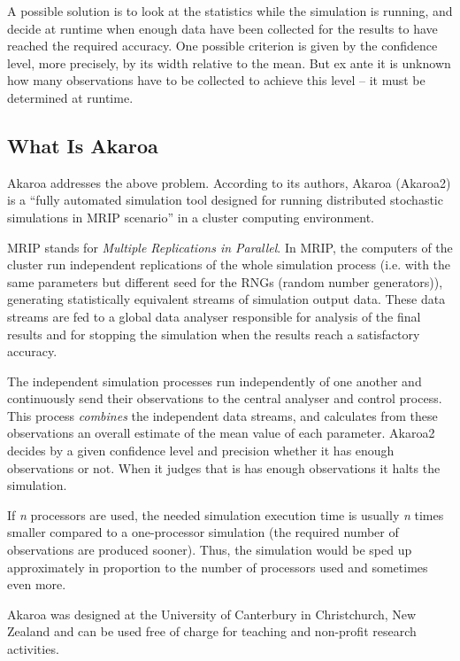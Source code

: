 A possible solution is to look at the statistics while the simulation
is running, and decide at runtime when enough data have been
collected for the results to have reached the required accuracy.
One possible criterion is given by the confidence level,
more precisely, by its width relative to the mean.
But ex ante it is unknown how many observations have to be collected
to achieve this level -- it must be determined at runtime.


\subsection{What Is Akaroa}
\label{sec:run-sim:what-is-akaroa}

Akaroa \cite{Akaroa99} addresses the above problem.
According to its authors, Akaroa (Akaroa2) is a ``fully automated
simulation tool designed for running distributed stochastic simulations
in MRIP scenario'' in a cluster computing environment.

MRIP stands for \textit{Multiple Replications in Parallel}.
In MRIP, the computers of the cluster run independent replications
of the whole simulation process (i.e. with the same parameters but
different seed for the RNGs (random number generators)),
generating statistically equivalent streams of simulation output data.
These data streams are fed to a global data analyser responsible for
analysis of the final results and for stopping the simulation
when the results reach a satisfactory accuracy.

The independent simulation processes run independently of one another
and continuously send their observations to the central analyser
and control process. This process \textit{combines} the independent data streams,
and calculates from these observations an overall estimate of the mean value
of each parameter.
Akaroa2 decides by a given confidence level and precision
whether it has enough observations or not. When it judges that is
has enough observations it halts the simulation.

If \textit{n} processors are used, the needed simulation execution time
is usually \textit{n} times smaller compared to a one-processor
simulation (the required number of observations are produced sooner).
Thus, the simulation would be sped up approximately in proportion
to the number of processors used and sometimes even more.

Akaroa was designed at the University of Canterbury in Christchurch, New Zealand
and can be used free of charge for teaching and non-profit research activities.


